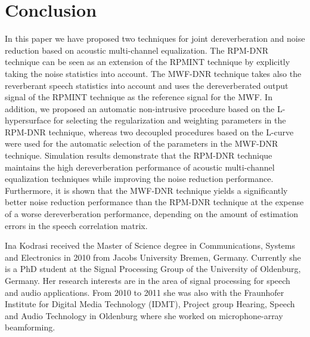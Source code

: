 \documentclass[10pt]{IEEEtran}
\begin{document}
\section{Conclusion}
In this paper we have proposed two techniques for joint dereverberation and noise reduction based on acoustic multi-channel equalization.
The RPM-DNR technique can be seen as an extension of the RPMINT technique by explicitly taking the noise statistics into account. 
The MWF-DNR technique takes also the reverberant speech statistics into account and uses the dereverberated output signal of the RPMINT technique as the reference signal for the MWF.
In addition, we proposed an automatic non-intrusive procedure based on the L-hypersurface for selecting the regularization and weighting parameters in the RPM-DNR technique, whereas two decoupled procedures based on the L-curve were used for the automatic selection of the parameters in the MWF-DNR technique.
Simulation results demonstrate that the RPM-DNR technique maintains the high dereverberation performance of acoustic multi-channel equalization techniques while improving the noise reduction performance. 
Furthermore, it is shown that the MWF-DNR technique yields a significantly better noise reduction performance than the RPM-DNR technique at the expense of a worse dereverberation performance, depending on the amount of estimation errors in the speech correlation matrix.




\begin{IEEEbiography}
{Ina Kodrasi} received the Master of Science degree in Communications, Systems and Electronics in 2010 from Jacobs University Bremen, Germany.
Currently she is a PhD student at the Signal Processing Group of the University of Oldenburg, Germany.
Her research interests are in the area of signal processing for speech and audio applications.
From 2010 to 2011 she was also with the Fraunhofer Institute for Digital Media Technology (IDMT), Project group
Hearing, Speech and Audio Technology in Oldenburg where she worked on microphone-array beamforming.
\end{IEEEbiography}
\end{document}
